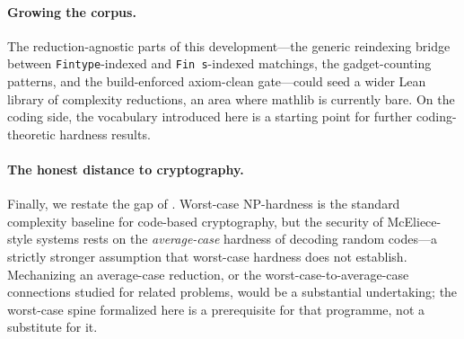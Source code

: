 \documentclass[a4paper,UKenglish,cleveref,autoref]{lipics-v2021}
\begin{document}
\paragraph*{Growing the corpus.} The reduction-agnostic parts of this development---the generic reindexing
bridge between \lstinline{Fintype}-indexed and \lstinline{Fin s}-indexed matchings, the gadget-counting
patterns, and the build-enforced axiom-clean gate---could seed a wider Lean library of complexity reductions, an
area where mathlib is currently bare. On the coding side, the vocabulary introduced here is a starting point for
further coding-theoretic hardness results.

\paragraph*{The honest distance to cryptography.} Finally, we restate the gap of . Worst-case
NP-hardness is the standard complexity baseline for code-based cryptography, but the security of McEliece-style
systems rests on the \emph{average-case} hardness of decoding random codes---a strictly stronger assumption that
worst-case hardness does not establish. Mechanizing an average-case reduction, or the worst-case-to-average-case
connections studied for related problems, would be a substantial undertaking; the worst-case spine formalized
here is a prerequisite for that programme, not a substitute for it.
\end{document}
